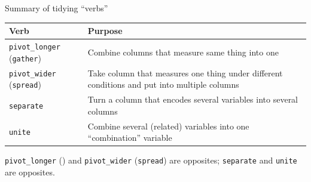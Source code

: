 \documentclass[ignorenonframetext,]{beamer}
\begin{document}
\begin{frame}{Summary of tidying ``verbs''}
\protect\hypertarget{summary-of-tidying-verbs}{}

\begin{tabular}{lp{}}
    Verb & Purpose\\
    \hline
    \texttt{pivot\_longer} (\texttt{gather}) & Combine columns that measure same thing into one\\
    \texttt{pivot\_wider} (\texttt{spread}) & Take column that measures one thing under
                     different conditions and put into multiple columns\\
    \texttt{separate} & Turn a column that encodes
                        several variables into
                        several columns\\
    \texttt{unite} & Combine several (related) variables into one
                     ``combination'' variable\\
    \hline
  \end{tabular}

\texttt{pivot\_longer} () and \texttt{pivot\_wider}
(\texttt{spread}) are opposites; \texttt{separate} and \texttt{unite}
are opposites.

\end{frame}
\end{document}
